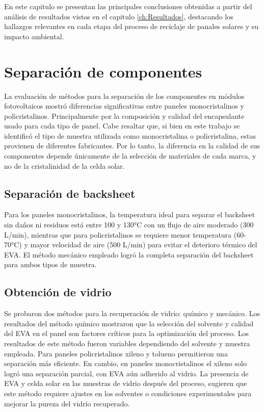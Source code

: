  En este capitulo se presentan las principales conclusiones obtenidas a partir del análisis de resultados vistos en el capitulo \ref{ch:Resultados}, destacando los hallazgos relevantes en cada etapa del proceso de reciclaje de panales solares y su impacto ambiental.
 
 \section{Separación de componentes}
 \label{sec:Separacion de compoenentes conclusiones}
 
 La evaluación de métodos para la separación de los componentes en módulos fotovoltaicos mostró diferencias significativas entre paneles monocristalinos y policristalinos. Principalmente por la composición y calidad del encapsulante usado para cada tipo de panel. Cabe resaltar que, si bien en este trabajo se identificó el tipo de muestra utilizada como monocristalina o policristalina, estas provienen de diferentes fabricantes. Por lo tanto, la diferencia en la calidad de sus componentes depende únicamente de la selección de materiales de cada marca, y no de la cristalinidad de la celda solar. 
 
 \subsection{Separación de backsheet}
 \label{subsec:Conclusiones Backsheet}

 Para los paneles monocristalinos, la temperatura ideal para separar el backsheet sin daños ni residuos está entre 100 y 130°C con un flujo de aire moderado (300 L/min), mientras que para policristalinos se requiere menor temperatura (60-70°C) y mayor velocidad de aire (500 L/min) para evitar el deterioro térmico del EVA.
 El método mecánico empleado logró la completa separación del backsheet para ambos tipos de muestra. 
 
 \subsection{Obtención de vidrio}
 \label{subsec:Conclusiones vidrio}
 
 Se probaron dos métodos para la recuperación de vidrio: químico y mecánico. Los resultados del método químico mostraron que la selección del solvente y calidad del EVA en el panel son factores críticos para la optimización del proceso. Los resultados de este método fueron variables dependiendo del solvente y muestra empleada. Para paneles policristalinos xileno y tolueno permitieron una separación más eficiente. En cambio, en paneles monocristalinos el xileno solo logró una separación parcial, con EVA aún adherido al vidrio. La presencia de EVA y celda solar en las muestras de vidrio después del proceso, sugieren que este método requiere ajustes en los solventes o condiciones experimentales para mejorar la pureza del vidrio recuperado. 
 
